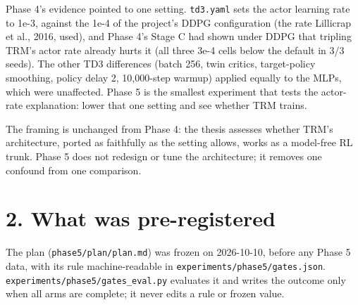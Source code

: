 \documentclass[11pt]{article}
\begin{document}
Phase 4's evidence pointed to one setting. \texttt{td3.yaml} sets the actor learning rate to 1e-3, against the 1e-4 of the project's DDPG configuration (the rate Lillicrap et al., 2016, used), and Phase 4's Stage C had shown under DDPG that tripling TRM's actor rate already hurts it (all three 3e-4 cells below the default in 3/3 seeds). The other TD3 differences (batch 256, twin critics, target-policy smoothing, policy delay 2, 10,000-step warmup) applied equally to the MLPs, which were unaffected. Phase 5 is the smallest experiment that tests the actor-rate explanation: lower that one setting and see whether TRM trains.



The framing is unchanged from Phase 4: the thesis assesses whether TRM's architecture, ported as faithfully as the setting allows, works as a model-free RL trunk. Phase 5 does not redesign or tune the architecture; it removes one confound from one comparison.



\section*{2. What was pre-registered}



The plan (\texttt{phase5/\allowbreak{}plan/\allowbreak{}plan.\allowbreak{}md}) was frozen on 2026-10-10, before any Phase 5 data, with its rule machine-readable in \texttt{experiments/\allowbreak{}phase5/\allowbreak{}gates.\allowbreak{}json}. \texttt{experiments/\allowbreak{}phase5/\allowbreak{}gates\_\allowbreak{}eval.\allowbreak{}py} evaluates it and writes the outcome only when all arms are complete; it never edits a rule or frozen value.
\end{document}
